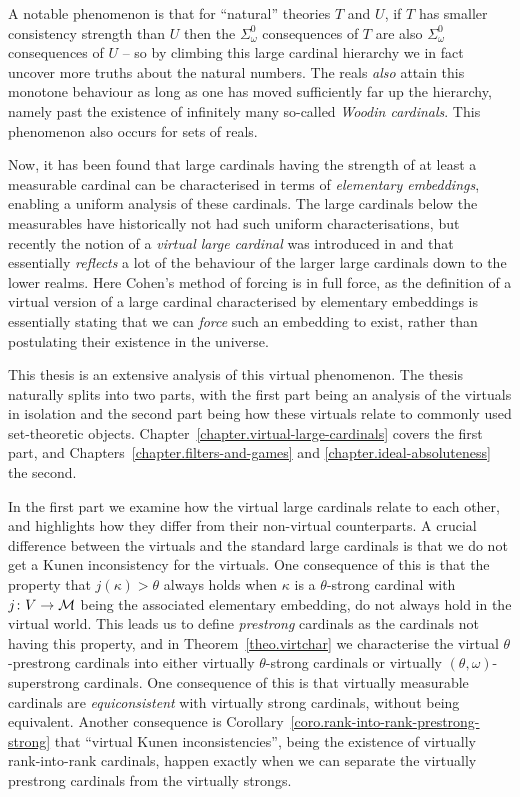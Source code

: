 \documentclass[../main]{subfiles}
\begin{document}
\begin{onehalfspacing}
\quad A notable phenomenon is that for ``natural'' theories $T$ and $U$, if $T$ has smaller consistency strength than $U$ then the $\Sigma^0_\omega$ consequences of $T$ are also $\Sigma^0_\omega$ consequences of $U$ -- so by climbing this large cardinal hierarchy we in fact uncover more truths about the natural numbers. The reals \textit{also} attain this monotone behaviour as long as one has moved sufficiently far up the hierarchy, namely past the existence of infinitely many so-called \textit{Woodin cardinals}. This phenomenon also occurs for sets of reals.

\quad Now, it has been found that large cardinals having the strength of at least a measurable cardinal can be characterised in terms of \textit{elementary embeddings}, enabling a uniform analysis of these cardinals. The large cardinals below the measurables have historically not had such uniform characterisations, but recently the notion of a \textit{virtual large cardinal} was introduced in \cite{Schindler} and \cite{GitmanSchindler} that essentially \textit{reflects} a lot of the behaviour of the larger large cardinals down to the lower realms. Here Cohen's method of forcing is in full force, as the definition of a virtual version of a large cardinal characterised by elementary embeddings is essentially stating that we can \textit{force} such an embedding to exist, rather than postulating their existence in the universe.

\quad This thesis is an extensive analysis of this virtual phenomenon. The thesis naturally splits into two parts, with the first part being an analysis of the virtuals in isolation and the second part being how these virtuals relate to commonly used set-theoretic objects. Chapter~\ref{chapter.virtual-large-cardinals} covers the first part, and Chapters~\ref{chapter.filters-and-games} and \ref{chapter.ideal-absoluteness} the second. 

\quad In the first part we examine how the virtual large cardinals relate to each other, and highlights how they differ from their non-virtual counterparts. A crucial difference between the virtuals and the standard large cardinals is that we do not get a Kunen inconsistency for the virtuals. One consequence of this is that the property that $j(\kappa)>\theta$ always holds when $\kappa$ is a $\theta$-strong cardinal with $j\colon V\to\operatorname{\mathcal M}$ being the associated elementary embedding, do not always hold in the virtual world. This leads us to define \textit{prestrong} cardinals as the cardinals not having this property, and in Theorem~\ref{theo.virtchar} we characterise the virtual $\theta$-prestrong cardinals into either virtually $\theta$-strong cardinals or virtually $(\theta,\omega)$-superstrong cardinals. One consequence of this is that virtually measurable cardinals are \textit{equiconsistent} with virtually strong cardinals, without being equivalent. Another consequence is Corollary~\ref{coro.rank-into-rank-prestrong-strong} that ``virtual Kunen inconsistencies'', being the existence of virtually rank-into-rank cardinals, happen exactly when we can separate the virtually prestrong cardinals from the virtually strongs.


\end{onehalfspacing}
\end{document}
